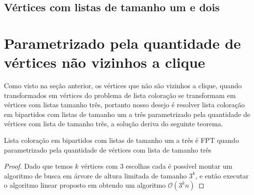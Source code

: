 \subsection{Vértices com listas de tamanho um e dois}

\section{Parametrizado pela quantidade de vértices não vizinhos a clique}
Como visto na seção anterior, os vértices que não são vizinhos a clique, quando transformados em vértices do problema de lista coloração se transformam em vértices com listas tamanho três, portanto nosso desejo é resolver lista coloração em bipartidos com listas de tamanho um a três parametrizado pela quantidade de vértices com lista de tamanho três, a solução deriva do seguinte teorema.

\begin{teorema}
 Lista coloração em bipartidos com listas de tamanho um a três é FPT quando parametrizado pela quantidade de vértices com lista de tamanho três
\end{teorema}
\begin{proof}
 Dado que temos $k$ vértices com 3 escolhas cada é possível montar um algoritmo de busca em árvore de altura limitada de tamanho $3^k$, e então executar o algoritmo linear proposto em \cite{hujter93} obtendo um algoritmo $\mathcal{O}(3^kn)$
 
\end{proof}
